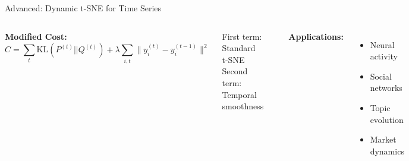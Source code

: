 \documentclass[aspectratio=169]{beamer}
\begin{document}
\begin{frame}{Advanced: Dynamic t-SNE for Time Series}
\begin{columns}
\textbf{Modified Cost:}
$$C = \sum_t \text{KL}(P^{(t)}||Q^{(t)}) + \lambda\sum_{i,t} \|y_i^{(t)} - y_i^{(t-1)}\|^2$$

First term: Standard t-SNE\\
Second term: Temporal smoothness

\includegraphics[width=\textwidth]{./Figures/dynamic_tsne.png}

\textbf{Applications:}
\begin{itemize}
\item Neural activity
\item Social networks
\item Topic evolution
\item Market dynamics
\end{itemize}
\end{columns}
\end{frame}
\end{document}
